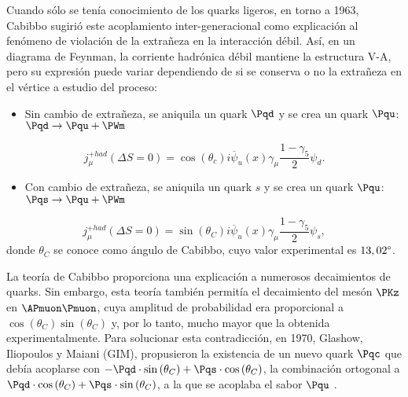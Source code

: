 Cuando sólo se tenía conocimiento de los quarks ligeros, en torno a 1963, Cabibbo sugirió este acoplamiento inter-generacional como explicación al fenómeno de violación de la extrañeza en la interacción débil. Así, en un diagrama de Feynman, la corriente hadrónica débil mantiene la estructura V-A, pero su expresión puede variar dependiendo de si se conserva o no la extrañeza en el vértice a estudio del proceso:
\begin{itemize}
\item Sin cambio de extrañeza, se aniquila un quark $\Pqd$ y se crea un quark $\Pqu$: $\Pqd \rightarrow \Pqu + \PWm$
\end{itemize}
\begin{equation}
j_{\mu}^{+had}(\Delta S= 0)=\cos \left( \theta _{c}\right) i\overline{\psi }_{u}\left( x\right) \gamma _{\mu }\dfrac{1-\gamma _{5}}{2}\psi _{d} .
\end{equation}
\begin{itemize}
\item Con cambio de extrañeza, se aniquila un quark $s$ y se crea un quark $\Pqu$: $\Pqs \rightarrow \Pqu + \PWm$
\end{itemize}
\begin{equation}
j_{\mu}^{+had}(\Delta S= 0)=\sin \left( \theta _{C}\right) i\overline{\psi }_{u}\left( x\right) \gamma _{\mu }\dfrac{1-\gamma _{5}}{2}\psi _{s} ,
\end{equation}
donde $\theta_{C}$ se conoce como ángulo de Cabibbo, cuyo valor experimental es $13,02\degree$.

La teoría de Cabibbo proporciona una explicación a numerosos decaimientos de quarks. Sin embargo, esta teoría también permitía el decaimiento del mesón $\PKz$ en $\APmuon\Pmuon$, cuya amplitud de probabilidad era proporcional a $\cos \left( \theta _{C}\right) \sin \left( \theta _{C}\right)$ y, por lo tanto, mucho mayor que la obtenida experimentalmente.  Para solucionar esta contradicción, en 1970, Glashow, Iliopoulos y Maiani (GIM), propusieron la existencia de un nuevo quark $\Pqc$ que debía acoplarse con $-\Pqd \cdot \sin \left( \theta _{C}\right) + \Pqs \cdot \cos \left( \theta_C \right)$, la combinación ortogonal a $\Pqd \cdot \cos \left( \theta _{C}\right) + \Pqs \cdot \sin \left( \theta _{C}\right)$, a la que se acoplaba el sabor $\Pqu$ \cite{Griffiths2008}.

